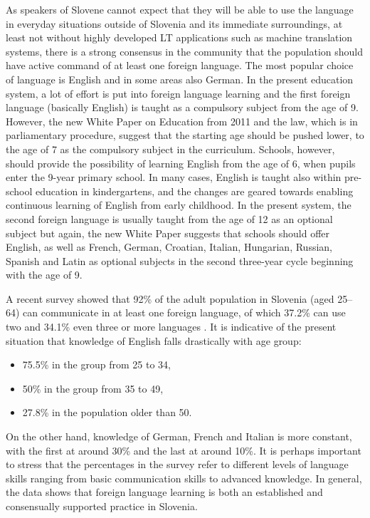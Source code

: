 \begin{multicols}{2}
As speakers of Slovene cannot expect that they will be able to use the language in everyday situations outside of Slovenia and its immediate surroundings, at least not without highly developed LT applications such as machine translation systems, there is a strong consensus in the community that the population should have active command of at least one foreign language. The most popular choice of language is English and in some areas also German. In the present education system, a lot of effort is put into foreign language learning and the first foreign language (basically English) is taught as a compulsory subject from the age of 9. However, the new White Paper on Education  from 2011  \cite{BK1} and the law, which is in parliamentary procedure, suggest that the starting age should be pushed lower, to the age of 7 as the compulsory subject in the curriculum. Schools, however, should provide the possibility of learning English from the age of 6, when pupils enter the 9-year primary school. In many cases, English is taught also within pre-school education in kindergartens, and the changes are geared towards enabling continuous learning of English from early childhood. In the present system, the second foreign language is usually taught from the age of 12 as an optional subject but again, the new White Paper suggests that schools should offer English, as well as French, German, Croatian, Italian, Hungarian, Russian, Spanish and Latin as optional subjects in the second three-year cycle beginning with the age of 9. 

A recent survey showed that 92\% of the adult population in Slovenia (aged 25--64) can communicate in at least one foreign language, of which 37.2\% can use two and 34.1\% even three or more languages \cite{SURS2}.  It is indicative of the present situation that knowledge of English falls drastically with age group: 

\begin{itemize}
\item 75.5\% in the group from 25 to 34, 
\item 50\% in the group from 35 to 49, 
\item 27.8\% in the population older than 50.
\end{itemize}

On the other hand, knowledge of German, French and Italian is more constant, with the first at around 30\% and the last at around 10\%. It is perhaps important to stress that the percentages in the survey refer to different levels of language skills ranging from basic communication skills to advanced knowledge. In general, the data shows that foreign language learning is both an established and consensually supported practice in Slovenia.


\end{multicols}
